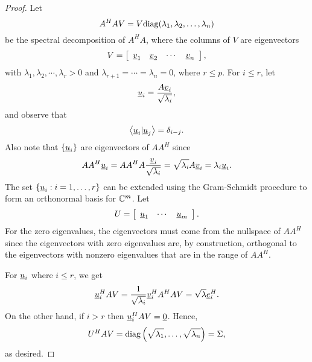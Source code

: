 \begin{proof}
Let
\begin{equation*}
A^H A V = V \mathrm{diag} ( \lambda_1, \lambda_2, \ldots, \lambda_n )
\end{equation*}
be the spectral decomposition of $A^H A$, where the columns of $V$ are eigenvectors
\begin{equation*}
V = \left[ \begin{array}{cccc} \underline{v}_1 & \underline{v}_2 & \cdots & \underline{v}_n \end{array} \right], 
\end{equation*}
with $\lambda_1, \lambda_2, \cdots, \lambda_r > 0$ and $\lambda_{r+1} = \cdots = \lambda_{n} = 0$, where $r \leq p$.
For $i \leq r$, let
\begin{equation*}
\underline{u}_i = \frac{A \underline{v}_i}{\sqrt{\lambda_i}},
\end{equation*}
and observe that
\begin{equation*}
\left\langle \underline{u}_i | \underline{u}_j \right\rangle = \delta_{i-j} .
\end{equation*}
Also note that $\{ \underline{u}_i \}$ are eigenvectors of $A A^H$ since
\begin{equation*}
A A^H \underline{u}_i
= A A^H A \frac{\underline{v}_i}{\sqrt{\lambda_i}}
= \sqrt{\lambda_i} A \underline{v}_i
= \lambda_i \underline{u}_i .
\end{equation*}
The set $\left\{ \underline{u}_i: i = 1, \ldots, r \right\}$ can be extended using the Gram-Schmidt procedure to form an orthonormal basis for $\mathbb{C}^m$.
Let
\begin{equation*}
U = \left[ \begin{array}{ccc} \underline{u}_1 & \cdots & \underline{u}_m \end{array} \right] .
\end{equation*}
For the zero eigenvalues, the eigenvectors must come from the nullspace of $A A^H$ since the eigenvectors with zero eigenvalues are, by construction, orthogonal to the eigenvectors with nonzero eigenvalues that are in the range of $A A^H$.

For $\underline{u}_i$ where $i \leq r$, we get
\begin{equation*}
\underline{u}_i^H A V 
= \frac{1}{\sqrt{\lambda_i}} \underline{v}_i^H A^H A V
= \sqrt{\lambda} \underline{e}_i^H .
\end{equation*}
On the other hand, if $i > r$ then $\underline{u}_i^H A V = \underline{0}$.
Hence,
\begin{equation*}
U^H A V = \mathrm{diag} \left( \sqrt{\lambda_1}, \ldots, \sqrt{\lambda_n} \right)
= \Sigma ,
\end{equation*}
as desired.
\end{proof}

